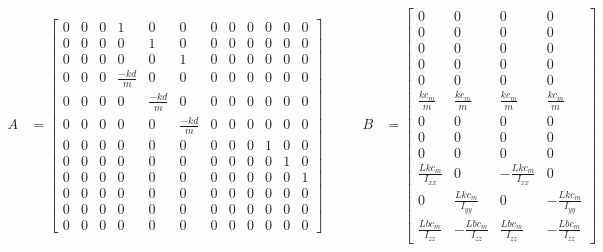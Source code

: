 \documentclass[12pt]{article}
\begin{document}
\begin{equation*}
  \begin{split}
  A &= 
  \begin{bmatrix}
  0 & 0 & 0 & 1 & 0 & 0 & 0 & 0 & 0 & 0 & 0 & 0 \\
  0 & 0 & 0 & 0 & 1 & 0 & 0 & 0 & 0 & 0 & 0 & 0 \\
  0 & 0 & 0 & 0 & 0 & 1 & 0 & 0 & 0 & 0 & 0 & 0 \\
  0 & 0 & 0 & \frac{-kd}{m} & 0 & 0 & 0 & 0 & 0 & 0 & 0 & 0 \\
  0 & 0 & 0 & 0 & \frac{-kd}{m} & 0 & 0 & 0 & 0 & 0 & 0 & 0 \\
  0 & 0 & 0 & 0 & 0 & \frac{-kd}{m} & 0 & 0 & 0 & 0 & 0 & 0 \\
  0 & 0 & 0 & 0 & 0 & 0 & 0 & 0 & 0 & 1 & 0 & 0 \\
  0 & 0 & 0 & 0 & 0 & 0 & 0 & 0 & 0 & 0 & 1 & 0 \\
  0 & 0 & 0 & 0 & 0 & 0 & 0 & 0 & 0 & 0 & 0 & 1 \\
  0 & 0 & 0 & 0 & 0 & 0 & 0 & 0 & 0 & 0 & 0 & 0 \\
  0 & 0 & 0 & 0 & 0 & 0 & 0 & 0 & 0 & 0 & 0 & 0 \\
  0 & 0 & 0 & 0 & 0 & 0 & 0 & 0 & 0 & 0 & 0 & 0 
  \end{bmatrix} \\
  \end{split}
\quad\quad
  \begin{split}
  B &= 
  \begin{bmatrix}
  0 & 0 & 0 & 0  \\
  0 & 0 & 0 & 0  \\
  0 & 0 & 0 & 0  \\
  0 & 0 & 0 & 0 \\
  0 & 0 & 0 & 0 \\
  \frac{kc_m}{m} & \frac{kc_m}{m} & \frac{kc_m}{m} & \frac{kc_m}{m} \\
  0 & 0 & 0 & 0 \\
  0 & 0 & 0 & 0 \\
  0 & 0 & 0 & 0 \\
  \frac{Lkc_m}{I_{xx}} & 0 & -\frac{Lkc_m}{I_{xx}} & 0 \\
  0 & \frac{Lkc_m}{I_{yy}} & 0 & -\frac{Lkc_m}{I_{yy}} \\
  \frac{Lbc_m}{I_{zz}} & -\frac{Lbc_m}{I_{zz}} & \frac{Lbc_m}{I_{zz}} & -\frac{Lbc_m}{I_{zz}} 
  \end{bmatrix} \\
  \end{split}
\end{equation*}
\end{document}
